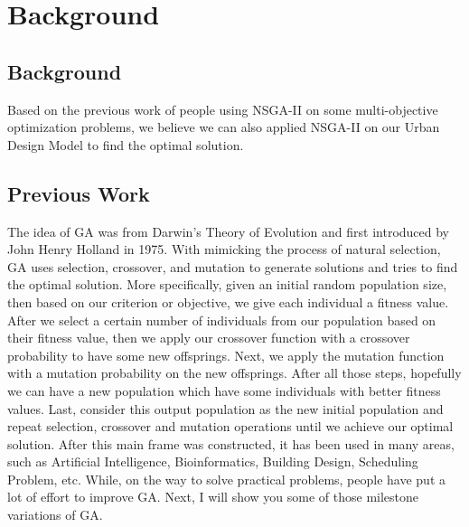 \chapter{Background}
\label{chap:background}

\section{Background}
Based on the previous work of people using NSGA-II on some multi-objective optimization problems\cite{Magnier_2010_Multiobjective}, we believe we can also applied NSGA-II on our Urban Design Model to find the optimal solution. 

\section{Previous Work}

The idea of GA was from Darwin's Theory of Evolution and first introduced by John Henry Holland in 1975\cite{Holland_1975_Book}. With mimicking the process of natural selection, GA uses selection, crossover, and mutation to generate solutions and tries to find the optimal solution. More specifically, given an initial random population size, then based on our criterion or objective, we give each individual a fitness value. After we select a certain number of individuals from our population based on their fitness value, then we apply our crossover function with a crossover probability to have some new offsprings. Next, we apply the mutation function with a mutation probability on the new offsprings. After all those steps, hopefully we can  have a new population which have some individuals with better fitness values. Last, consider this output population as the new initial population and repeat selection, crossover and mutation operations until we achieve our optimal solution. After this main frame was constructed, it has been used in many areas, such as Artificial Intelligence, Bioinformatics, Building Design, Scheduling Problem, etc. While, on the way to solve practical problems, people have put a lot of effort to improve GA. Next, I will show you some of those milestone variations of GA. 

